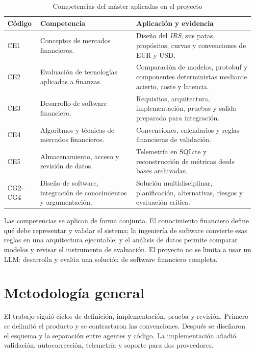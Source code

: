 \begin{table}[H]
\centering
\small
\caption{Competencias del máster aplicadas en el proyecto}
\label{tab:competencias_master}
\begin{tabular}{|P{1.3cm}|P{4.7cm}|P{7.0cm}|}
\hline
\textbf{Código} & \textbf{Competencia} & \textbf{Aplicación y evidencia} \\
\hline
CE1 & Conceptos de mercados financieros. & Diseño del \textit{IRS}, sus patas, propósitos, curvas y convenciones de EUR y USD. \\
\hline
CE2 & Evaluación de tecnologías aplicadas a finanzas. & Comparación de modelos, protobuf y componentes deterministas mediante acierto, coste y latencia. \\
\hline
CE3 & Desarrollo de software financiero. & Requisitos, arquitectura, implementación, pruebas y salida preparada para integración. \\
\hline
CE4 & Algoritmos y técnicas de mercados financieros. & Convenciones, calendarios y reglas financieras de validación. \\
\hline
CE5 & Almacenamiento, acceso y revisión de datos. & Telemetría en SQLite y reconstrucción de métricas desde bases archivadas. \\
\hline
CG2--CG4 & Diseño de software, integración de conocimientos y argumentación. & Solución multidisciplinar, planificación, alternativas, riesgos y evaluación crítica. \\
\hline
\end{tabular}
\end{table}

Las competencias se aplican de forma conjunta. El conocimiento financiero define qué debe representar y validar el sistema; la ingeniería de software convierte esas reglas en una arquitectura ejecutable; y el análisis de datos permite comparar modelos y revisar el instrumento de evaluación. El proyecto no se limita a usar un LLM: desarrolla y evalúa una solución de software financiero completa.

\section{Metodología general}
\label{sec:metodologia_general}

El trabajo siguió ciclos de definición, implementación, prueba y revisión. Primero se delimitó el producto y se contrastaron las convenciones. Después se diseñaron el esquema y la separación entre agentes y código. La implementación añadió validación, autocorrección, telemetría y soporte para dos proveedores.

